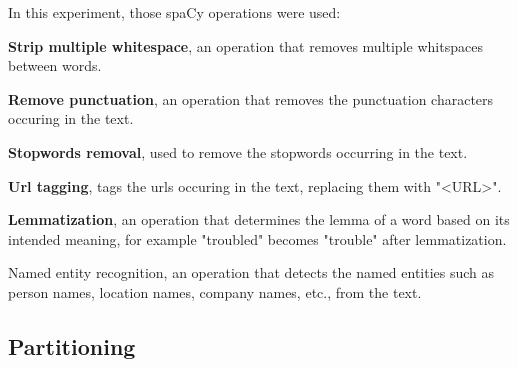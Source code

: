 \documentclass[12pt, a4paper]{article}
\begin{document}
\hfill\break
In this experiment, those spaCy operations were used:

\textbf{Strip multiple whitespace}, an operation that removes multiple whitspaces between words.


\textbf{Remove punctuation}, an operation that removes the punctuation characters occuring in the text.

\textbf{Stopwords removal}, used to remove the stopwords occurring in the text.


\textbf{Url tagging}, tags the urls occuring in the text, replacing them with "<URL>".


\textbf{Lemmatization}, an operation that determines the lemma of a word based on its intended meaning, for example "troubled" becomes "trouble" after lemmatization.


Named entity recognition, an operation that detects the named entities such as person names, location names, company names, etc., from the text.




\subsection{Partitioning}\label{subsec:partitioning}
\end{document}
